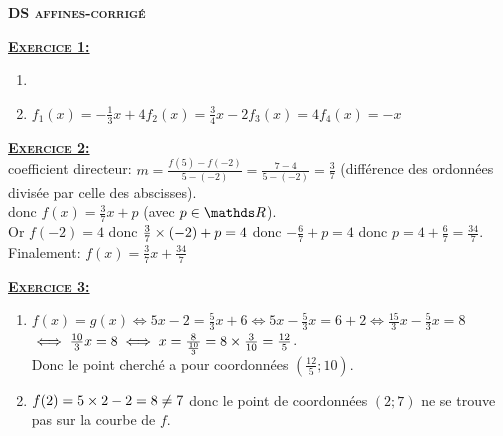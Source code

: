 \documentclass[12pt,a4paper]{article}
\begin{document}
\pagestyle{empty}
\begin{center}{\LARGE \textbf{\textsc{DS affines-corrigé}}}\end{center}

\textbf{\textsc{\underline{Exercice 1:}}}
\begin{enumerate}
\item \medskip 
{}
\medskip
\item $f_{1}(x)=-\frac{1}{3} x+4$\hfill $f_{2}(x)=\frac{3}{4}x-2$\hfill $f_{3}(x)=4$\hfill $f_{4}(x)=-x$
\end{enumerate}

\vspace{0,5cm}

\textbf{\textsc{\underline{Exercice 2:}}}\\
coefficient directeur: $m=\frac{f(5)-f(-2)}{5-(-2)}=\frac{7-4}{5-(-2)}=\frac{3}{7}$ (différence des ordonnées divisée par celle des abscisses).\\
donc $f(x)=\frac{3}{7}x+p$ (avec $p\in\R$).\\
Or $f(-2)=4$ donc $\frac{3}{7}\times (-2)+p=4$ donc $-\frac{6}{7}+p=4$ donc $p=4+\frac{6}{7}=\frac{34}{7}$.\\
Finalement: $f(x)=\frac{3}{7}x+\frac{34}{7}$

\vspace{0,5cm}

\textbf{\textsc{\underline{Exercice 3:}}}
\begin{enumerate}
\item $f(x)=g(x)\iff 5x-2=\frac{5}{3}x+6\iff 5x-\frac{5}{3}x=6+2\iff \frac{15}{3}x-\frac{5}{3}x=8$\medskip\\
$\iff \frac{10}{3}x=8\iff x=\frac{8}{\frac{10}{3}}=8\times \frac{3}{10}=\frac{12}{5}$.\medskip\\
Donc le point cherché a pour coordonnées $(\frac{12}{5};10)$.
\item $f(2)=5\times2-2=8\neq 7$ donc le point de coordonnées $(2;7)$ ne se trouve pas sur la courbe de $f$.\medskip 
\end{enumerate}
\end{document}
